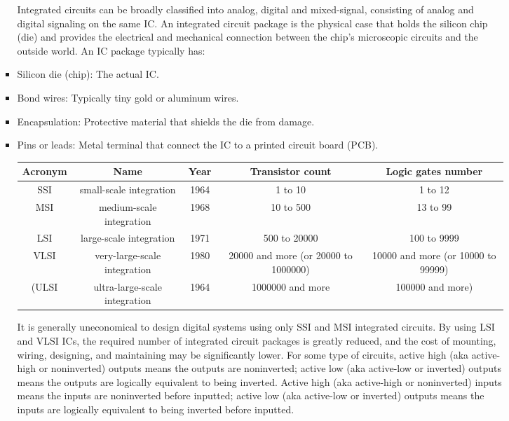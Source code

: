 \documentclass[a4paper,12pt]{article}
\begin{document}
\begin{itemize}
\begin{itemize}
\begin{itemize}
\begin{itemize}
\begin{itemize}
\begin{itemize}
\begin{itemize}
Integrated circuits can be broadly classified into analog, digital and mixed-signal, consisting of analog and digital signaling on the same IC.
An integrated circuit package is the physical case that holds the silicon chip (die) and provides the electrical and mechanical connection between the chip’s microscopic circuits and the outside world. An IC package typically has:
\bit
\item Silicon die (chip): The actual IC.
\item Bond wires: Typically tiny gold or aluminum wires.
\item Encapsulation: Protective material that shields the die from damage.
\item Pins or leads: Metal terminal that connect the IC to a printed circuit board (PCB).
\eit
{}
\begin{longtable}[c]{|c|c|c|c|c|}
    \hline
    Acronym & Name & Year & Transistor count & Logic gates number \\\hline
    SSI & small-scale integration & 1964 & 1 to 10 & 1 to 12 \\\hline
    MSI & medium-scale integration & 1968 & 10 to 500 & 13 to 99 \\\hline
    LSI & large-scale integration & 1971 & 500 to 20000 & 100 to 9999 \\\hline
    VLSI & very-large-scale integration & 1980 & 20000 and more (or 20000 to 1000000) & 10000 and more (or 10000 to 99999) \\\hline
    (ULSI & ultra-large-scale integration & 1964 & 1000000 and more & 100000 and more) \\\hline
\end{longtable}

It is generally uneconomical to design digital systems using only SSI and MSI integrated circuits. By using LSI and VLSI ICs, the required number of integrated circuit packages is greatly reduced, and the cost of mounting, wiring, designing, and maintaining may be significantly lower.
For some type of circuits, active high (aka active-high or noninverted) outputs means the outputs are noninverted; active low (aka active-low or inverted) outputs means the outputs are logically equivalent to being inverted. Active high (aka active-high or noninverted) inputs means the inputs are noninverted before inputted; active low (aka active-low or inverted) outputs means the inputs are logically equivalent to being inverted before inputted.


\end{itemize}
\end{itemize}
\end{itemize}
\end{itemize}
\end{itemize}
\end{itemize}
\end{itemize}
\end{document}
